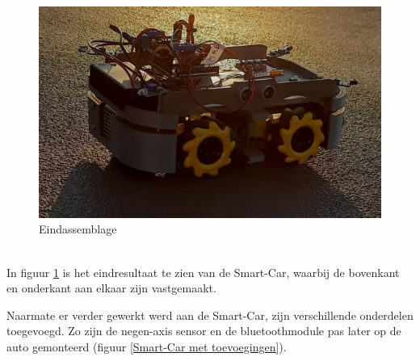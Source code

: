 \begin{figure}[h]
    \centering
    \includegraphics[scale = 0.7]{Media/Figuren/Assemblage/assembleren totaal.jpg}
    \caption{Eindassemblage}
    \label{Eindresultaat-Smart-Car}
\end{figure}
\\
In figuur \ref{Eindresultaat-Smart-Car} is het eindresultaat te zien van de \gls{Smart-Car}, waarbij de bovenkant en onderkant aan elkaar zijn vastgemaakt.

Naarmate er verder gewerkt werd aan de \gls{Smart-Car}, zijn verschillende onderdelen toegevoegd. Zo zijn de negen-axis sensor en de bluetoothmodule pas later op de auto gemonteerd (figuur \ref{Smart-Car met toevoegingen}). 

